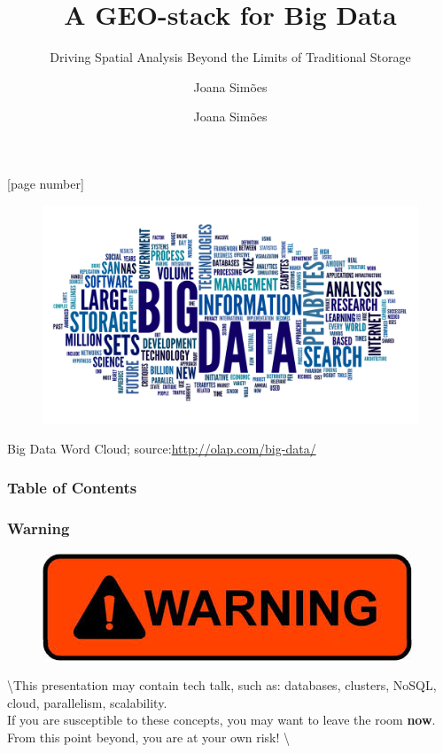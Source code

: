 \documentclass[hyperref={pdfpagelabels=true}]{beamer}
\title{A GEO-stack for Big Data}
\subtitle{ Driving Spatial Analysis Beyond the Limits of
Traditional Storage}
\author{Joana Sim\~{o}es}
\author[shortname]{Joana Sim\~{o}es \inst{1}}
\institute[shortinst]{\inst{1} Bdigital, CASA, CICS.NOVA}
\begin{document}
[page number]
\begin{frame}
\titlepage


\end{frame} 
 
\begin{frame}
\begin{figure}
  \includegraphics[width=\textwidth]{wordcloud.jpg}
\end{figure}
\tiny{Big Data Word Cloud; source:\url{http://olap.com/big-data/}}
\end{frame} 
 
 
\begin{frame}
\frametitle{Table of Contents}
\tableofcontents%
\end{frame}

\begin{frame}
\frametitle{Warning}
\begin{figure}
  \includegraphics[scale=0.40]{warning.jpeg}
\end{figure}
\textbackslash *
This presentation may contain tech talk, such as: databases, clusters, NoSQL, cloud, parallelism, scalability.\\
If you are susceptible to these concepts, you may want to leave the room \textbf{now}.\\
From this point beyond, you are at your own risk!
\textbackslash *
\end{frame}
\end{document}
